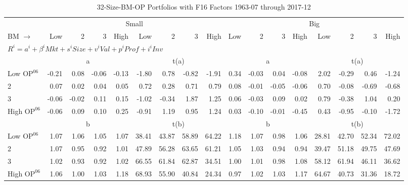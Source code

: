 
\begin{table}[!ht]
\footnotesize
\centering
\caption{32-Size-BM-OP Portfolios with F16 Factors 1963-07 through 2017-12}
\begin{tabular}{lrrrrrrrrrrrrrrrr}
  \toprule
     & \multicolumn{8}{c}{Small} & \multicolumn{8}{c}{Big}  \\
     \cmidrule(r){2-9} \cmidrule(r){10-17}
    BM $\rightarrow$ & Low & 2 & 3 & High & Low & 2 & 3 & High & Low & 2 & 3 & High & Low & 2 & 3 & High  \\ 
  \midrule
  \multicolumn{17}{l}{$R^i=a^i+\beta^iMkt+s^iSize+v^iVal+p^iProf+i^iInv$}  \\
  
     & \multicolumn{4}{c}{a} & \multicolumn{4}{c}{t(a)}  & \multicolumn{4}{c}{a} & \multicolumn{4}{c}{t(a)}   \\
     \cmidrule(r){2-5} \cmidrule(r){6-9}  \cmidrule(r){10-13} \cmidrule(r){14-17} 
    Low $\text{OP}^{06}$  & -0.21  & 0.08  & -0.06  & -0.13  & -1.80  & 0.78  & -0.82  & -1.91  & 0.34  & -0.03  & 0.04  & -0.08  & 2.02  & -0.29  & 0.46  & -1.24   \\
    2  & 0.07  & 0.02  & 0.04  & 0.05  & 0.72  & 0.28  & 0.71  & 0.79  & 0.08  & -0.01  & -0.05  & -0.06  & 0.70  & -0.08  & -0.69  & -0.68   \\
    3  & -0.06  & -0.02  & 0.11  & 0.15  & -1.02  & -0.34  & 1.87  & 1.25  & 0.06  & -0.03  & 0.09  & 0.02  & 0.79  & -0.38  & 1.04  & 0.20   \\
    High $\text{OP}^{06}$  & -0.06  & 0.09  & 0.10  & 0.25  & -0.91  & 1.19  & 0.95  & 1.24  & 0.03  & -0.10  & -0.01  & -0.45  & 0.43  & -0.95  & -0.10  & -1.72   \\
    
  
     & \multicolumn{4}{c}{b} & \multicolumn{4}{c}{t(b)}  & \multicolumn{4}{c}{b} & \multicolumn{4}{c}{t(b)}   \\
     \cmidrule(r){2-5} \cmidrule(r){6-9}  \cmidrule(r){10-13} \cmidrule(r){14-17} 
    Low $\text{OP}^{06}$  & 1.07  & 1.06  & 1.05  & 1.07  & 38.41  & 43.87  & 58.89  & 64.22  & 1.18  & 1.07  & 0.98  & 1.06  & 28.81  & 42.70  & 52.34  & 72.02   \\
    2  & 1.07  & 0.95  & 0.92  & 1.01  & 47.89  & 56.28  & 63.65  & 61.21  & 1.05  & 1.03  & 0.94  & 0.94  & 39.47  & 51.18  & 49.75  & 47.69   \\
    3  & 1.02  & 0.93  & 0.92  & 1.02  & 66.55  & 61.84  & 62.87  & 34.51  & 1.00  & 1.01  & 0.98  & 1.08  & 58.12  & 61.94  & 46.11  & 36.62   \\
    High $\text{OP}^{06}$  & 1.06  & 1.00  & 1.03  & 1.18  & 68.93  & 55.90  & 40.84  & 24.34  & 0.97  & 1.02  & 1.03  & 1.17  & 64.67  & 40.73  & 31.36  & 18.72   \\
    

\end{tabular}
\end{table}
